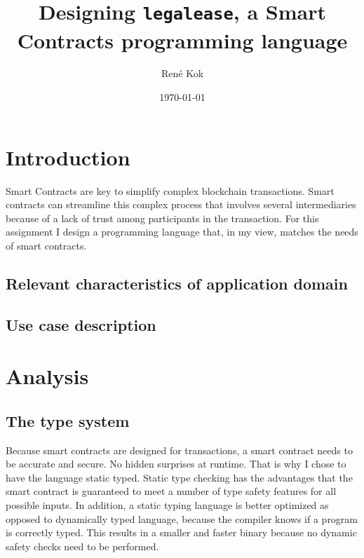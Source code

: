 \documentclass{uva-inf-article}
\title{Designing \texttt{legalease}, a Smart Contracts programming language}
\author{René Kok}
\date{\today}
\begin{document}
\maketitle




\section{Introduction}
Smart Contracts \cite{what-are-smart-contracts} are key to simplify complex blockchain transactions.
Smart contracts can streamline this complex process that involves several intermediaries because of a 
lack of trust among participants in the transaction.
For this assignment I design a programming language that, in my view, matches the needs of smart contracts.

\subsection{Relevant characteristics of application domain}

\subsection{Use case description}


\section{Analysis}
\subsection{The type system}
\par Because smart contracts are designed for transactions, a smart contract needs to be accurate and secure. 
No hidden surprises at runtime.
That is why I chose to have the language static typed.
Static type checking has the advantages that the smart contract is guaranteed to meet a number of type safety features for all possible inputs.
In addition, a static typing language is better optimized as opposed to dynamically typed language, because the compiler knows if a program is correctly typed.
This results in a smaller and faster binary because no dynamic safety checks need to be performed.
\end{document}
